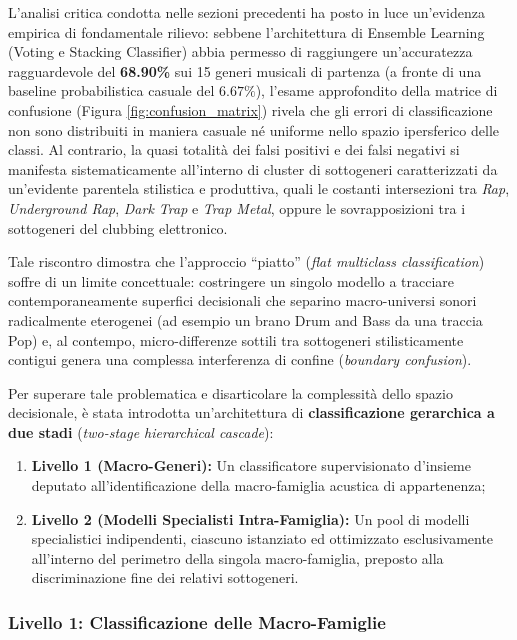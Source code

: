 \vspace{0.3cm}
L'analisi critica condotta nelle sezioni precedenti ha posto in luce un'evidenza empirica di fondamentale rilievo: sebbene l'architettura di Ensemble Learning (Voting e Stacking Classifier) abbia permesso di raggiungere un'accuratezza ragguardevole del \textbf{68.90\%} sui 15 generi musicali di partenza (a fronte di una baseline probabilistica casuale del $6.67\%$), l'esame approfondito della matrice di confusione (Figura \ref{fig:confusion_matrix}) rivela che gli errori di classificazione non sono distribuiti in maniera casuale né uniforme nello spazio ipersferico delle classi. Al contrario, la quasi totalità dei falsi positivi e dei falsi negativi si manifesta sistematicamente all'interno di cluster di sottogeneri caratterizzati da un'evidente parentela stilistica e produttiva, quali le costanti intersezioni tra \textit{Rap}, \textit{Underground Rap}, \textit{Dark Trap} e \textit{Trap Metal}, oppure le sovrapposizioni tra i sottogeneri del clubbing elettronico.

Tale riscontro dimostra che l'approccio ``piatto'' (\textit{flat multiclass classification}) soffre di un limite concettuale: costringere un singolo modello a tracciare contemporaneamente superfici decisionali che separino macro-universi sonori radicalmente eterogenei (ad esempio un brano Drum and Bass da una traccia Pop) e, al contempo, micro-differenze sottili tra sottogeneri stilisticamente contigui genera una complessa interferenza di confine (\textit{boundary confusion}). 

Per superare tale problematica e disarticolare la complessità dello spazio decisionale, è stata introdotta un'architettura di \textbf{classificazione gerarchica a due stadi} (\textit{two-stage hierarchical cascade}):
\begin{enumerate}
    \item \textbf{Livello 1 (Macro-Generi):} Un classificatore supervisionato d'insieme deputato all'identificazione della macro-famiglia acustica di appartenenza;
    \item \textbf{Livello 2 (Modelli Specialisti Intra-Famiglia):} Un pool di modelli specialistici indipendenti, ciascuno istanziato ed ottimizzato esclusivamente all'interno del perimetro della singola macro-famiglia, preposto alla discriminazione fine dei relativi sottogeneri.
\end{enumerate}

\subsubsection{Livello 1: Classificazione delle Macro-Famiglie}

